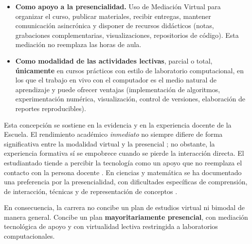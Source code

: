\begin{itemize}
    \item \textbf{Como apoyo a la presencialidad.} Uso de Mediación Virtual para organizar el curso, publicar materiales, recibir entregas, mantener comunicación asincrónica y disponer de recursos didácticos (notas, grabaciones complementarias, visualizaciones, repositorios de código). Esta mediación no reemplaza las horas de aula.
    \item \textbf{Como modalidad de las actividades lectivas}, parcial o total, \textbf{únicamente} en cursos prácticos con estilo de laboratorio computacional, en los que el trabajo en vivo con el computador es el medio natural de aprendizaje y puede ofrecer ventajas (implementación de algoritmos, experimentación numérica, visualización, control de versiones, elaboración de reportes reproducibles).
\end{itemize}

Esta concepción se sostiene en la evidencia y en la experiencia docente de la Escuela. El rendimiento académico \emph{inmediato} no siempre difiere de forma significativa entre la modalidad virtual y la presencial \cite{hachey2022post}; no obstante, la experiencia formativa sí se empobrece cuando se pierde la interacción directa. El estudiantado tiende a percibir la tecnología como un apoyo que no reemplaza el contacto con la persona docente \cite{Alshehri31122023}. En ciencias y matemática se ha documentado una preferencia por la presencialidad, con dificultades específicas de comprensión, de interacción, técnicas y de representación de conceptos \parencite{YorkovskyLevenberg2022}.

En consecuencia, la carrera no concibe un plan de estudios virtual ni bimodal de manera general. Concibe un plan \textbf{mayoritariamente presencial}, con mediación tecnológica de apoyo y con virtualidad lectiva restringida a laboratorios computacionales.




